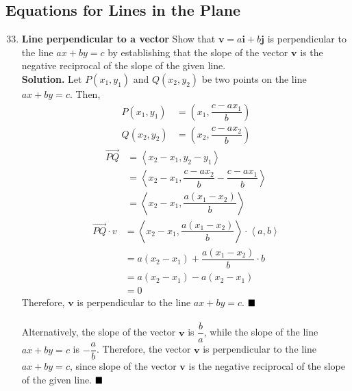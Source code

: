 \documentclass{report}
\begin{document}
\subsection*{Equations for Lines in the Plane}

\begin{enumerate}
    \setcounter{enumi}{32}
    \item \textbf{Line perpendicular to a vector} Show that $\mathbf{v}=a \mathbf{i}+b \mathbf{j}$ is perpendicular to the line $a x+b y=c$ by establishing that the slope of the vector $\mathbf{v}$ is the negative reciprocal of the slope of the given line.
          \\\textbf{Solution. }Let $P(x_1, y_1)$ and $Q(x_2, y_2)$ be two points on the line $ax + by = c$. Then,
          \begin{align*}
              P(x_1, y_1) & = \left(x_1, \dfrac{c - ax_1}{b}\right) \\
              Q(x_2, y_2) & = \left(x_2, \dfrac{c - ax_2}{b}\right)
          \end{align*}
          \begin{align*}
              \overrightarrow{PQ} & = \left\langle x_2 - x_1, y_2 - y_1 \right\rangle                                 \\
                                  & = \left\langle x_2 - x_1, \dfrac{c - ax_2}{b} - \dfrac{c - ax_1}{b} \right\rangle \\
                                  & = \left\langle x_2 - x_1, \dfrac{a(x_1 - x_2)}{b} \right\rangle
          \end{align*}
          \begin{align*}
              \overrightarrow{PQ} \cdot v & = \left\langle x_2 - x_1, \dfrac{a(x_1 - x_2)}{b} \right\rangle \cdot \left\langle a, b \right\rangle \\
                                          & = a(x_2 - x_1) + \dfrac{a(x_1 - x_2)}{b} \cdot b                                                      \\
                                          & = a(x_2 - x_1) - a(x_2 - x_1)                                                                         \\
                                          & = 0
          \end{align*}
          Therefore, $\mathbf{v}$ is perpendicular to the line $ax + by = c$. $\hfill\blacksquare$
          ~\\\\
          Alternatively, the slope of the vector $\mathbf{v}$ is $\dfrac{b}{a}$, while
          the slope of the line $ax + by = c$ is $-\dfrac{a}{b}$. Therefore, the vector
          $\mathbf{v}$ is perpendicular to the line $ax + by = c$, since slope of the vector $\mathbf{v}$ is the negative reciprocal of the slope of the given line. $\hfill\blacksquare$


\end{enumerate}
\end{document}
